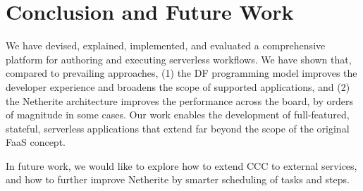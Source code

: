 \section{Conclusion and Future Work}

We have devised, explained, implemented, and evaluated a comprehensive platform for authoring and executing serverless workflows. We have shown that, compared to prevailing approaches, (1) the DF programming model improves the developer experience and broadens the scope of supported applications, and (2) the Netherite architecture improves the performance across the board, by orders of magnitude in some cases. Our work enables the development of full-featured, stateful, serverless applications that extend far beyond the scope of the original FaaS concept.

In future work, we would like to explore how to extend CCC to external services, and how to further improve Netherite by smarter scheduling of tasks and steps. 